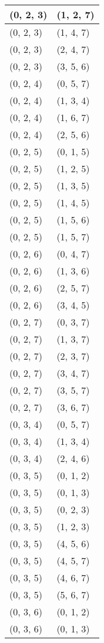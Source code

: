 \begin{footnotesize}
\begin{longtable}[c]{|l|l|}
(0, 2, 3)
&(1, 2, 7)
\\ \hline
(0, 2, 3)
&(1, 4, 7)
\\ \hline
(0, 2, 3)
&(2, 4, 7)
\\ \hline
(0, 2, 3)
&(3, 5, 6)
\\ \hline
(0, 2, 4)
&(0, 5, 7)
\\ \hline
(0, 2, 4)
&(1, 3, 4)
\\ \hline
(0, 2, 4)
&(1, 6, 7)
\\ \hline
(0, 2, 4)
&(2, 5, 6)
\\ \hline
(0, 2, 5)
&(0, 1, 5)
\\ \hline
(0, 2, 5)
&(1, 2, 5)
\\ \hline
(0, 2, 5)
&(1, 3, 5)
\\ \hline
(0, 2, 5)
&(1, 4, 5)
\\ \hline
(0, 2, 5)
&(1, 5, 6)
\\ \hline
(0, 2, 5)
&(1, 5, 7)
\\ \hline
(0, 2, 6)
&(0, 4, 7)
\\ \hline
(0, 2, 6)
&(1, 3, 6)
\\ \hline
(0, 2, 6)
&(2, 5, 7)
\\ \hline
(0, 2, 6)
&(3, 4, 5)
\\ \hline
(0, 2, 7)
&(0, 3, 7)
\\ \hline
(0, 2, 7)
&(1, 3, 7)
\\ \hline
(0, 2, 7)
&(2, 3, 7)
\\ \hline
(0, 2, 7)
&(3, 4, 7)
\\ \hline
(0, 2, 7)
&(3, 5, 7)
\\ \hline
(0, 2, 7)
&(3, 6, 7)
\\ \hline
(0, 3, 4)
&(0, 5, 7)
\\ \hline
(0, 3, 4)
&(1, 3, 4)
\\ \hline
(0, 3, 4)
&(2, 4, 6)
\\ \hline
(0, 3, 5)
&(0, 1, 2)
\\ \hline
(0, 3, 5)
&(0, 1, 3)
\\ \hline
(0, 3, 5)
&(0, 2, 3)
\\ \hline
(0, 3, 5)
&(1, 2, 3)
\\ \hline
(0, 3, 5)
&(4, 5, 6)
\\ \hline
(0, 3, 5)
&(4, 5, 7)
\\ \hline
(0, 3, 5)
&(4, 6, 7)
\\ \hline
(0, 3, 5)
&(5, 6, 7)
\\ \hline
(0, 3, 6)
&(0, 1, 2)
\\ \hline
(0, 3, 6)
&(0, 1, 3)
\\ \hline

\end{longtable}
\end{footnotesize}
